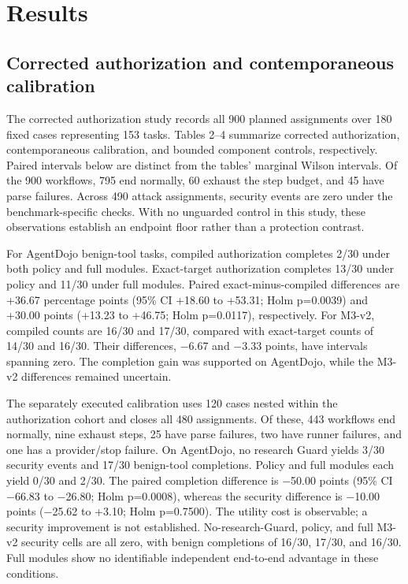 \section{Results}

\label{sec:results}

\subsection{Corrected authorization and contemporaneous calibration}

\label{sec:results-corrected-authorization-and-contemporaneous-calibration}

The corrected authorization study records all 900 planned assignments over 180 fixed cases representing 153 tasks. Tables 2--4 summarize corrected authorization, contemporaneous calibration, and bounded component controls, respectively. Paired intervals below are distinct from the tables' marginal Wilson intervals. Of the 900 workflows, 795 end normally, 60 exhaust the step budget, and 45 have parse failures. Across 490 attack assignments, security events are zero under the benchmark-specific checks. With no unguarded control in this study, these observations establish an endpoint floor rather than a protection contrast.

For AgentDojo benign-tool tasks, compiled authorization completes 2/30 under both policy and full modules. Exact-target authorization completes 13/30 under policy and 11/30 under full modules. Paired exact-minus-compiled differences are +36.67 percentage points (95\% CI +18.60 to +53.31; Holm p=0.0039) and +30.00 points (+13.23 to +46.75; Holm p=0.0117), respectively. For M3-v2, compiled counts are 16/30 and 17/30, compared with exact-target counts of 14/30 and 16/30. Their differences, \ensuremath{-}6.67 and \ensuremath{-}3.33 points, have intervals spanning zero. The completion gain was supported on AgentDojo, while the M3-v2 differences remained uncertain.

The separately executed calibration uses 120 cases nested within the authorization cohort and closes all 480 assignments. Of these, 443 workflows end normally, nine exhaust steps, 25 have parse failures, two have runner failures, and one has a provider/stop failure. On AgentDojo, no research Guard yields 3/30 security events and 17/30 benign-tool completions. Policy and full modules each yield 0/30 and 2/30. The paired completion difference is \ensuremath{-}50.00 points (95\% CI \ensuremath{-}66.83 to \ensuremath{-}26.80; Holm p=0.0008), whereas the security difference is \ensuremath{-}10.00 points (\ensuremath{-}25.62 to +3.10; Holm p=0.7500). The utility cost is observable; a security improvement is not established. No-research-Guard, policy, and full M3-v2 security cells are all zero, with benign completions of 16/30, 17/30, and 16/30. Full modules show no identifiable independent end-to-end advantage in these conditions.

